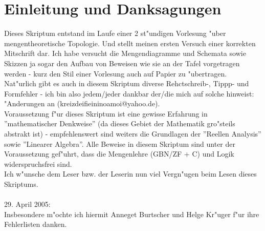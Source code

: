 \section{Einleitung und Danksagungen}
Dieses Skriptum entstand im Laufe einer 2 st"undigen Vorlesung "uber mengentheoretische Topologie. Und stellt meinen ersten Versuch einer korrekten Mitschrift dar. Ich habe versucht die Mengendiagramme und Schemata sowie Skizzen ja sogar den Aufbau von Beweisen wie sie an der Tafel vorgetragen werden - kurz den Stil einer Vorlesung auch auf Papier zu "ubertragen.\\
Nat"urlich gibt es auch in diesem Skriptum diverse Rehctschreib-, Tippp- und Formfehler - ich bin also jedem/jeder dankbar der/die mich auf solche hinweist:\\
"Anderungen an ({\sf kreizdeifieininoamoi@yahoo.de}).\\
Voraussetzung f"ur dieses Skriptum ist eine gewisse Erfahrung in ''mathematischer Denkweise'' (da dieses Gebiet der Mathematik gro"steils abstrakt ist) - empfehlenswert sind weiters die Grundlagen der ''Reellen Analysis'' sowie ''Linearer Algebra''.
Alle Beweise in diesem Skriptum sind unter der Voraussetzung gef"uhrt, dass die Mengenlehre (GBN/ZF + C) und Logik widerspruchsfrei sind.\\
Ich w"unsche dem Leser bzw. der Leserin nun viel Vergn"ugen beim Lesen dieses Skriptums.\\
\hspace*{3cm}{\sf Martin Heuschober}
\vspace*{1cm}\\
29. April 2005:\\
Insbesondere m"ochte ich hiermit Anneget Burtscher und Helge Kr"uger f"ur ihre Fehlerlisten danken.
\thispagestyle{empty}
\newpage
\setcounter{section}{-1}
